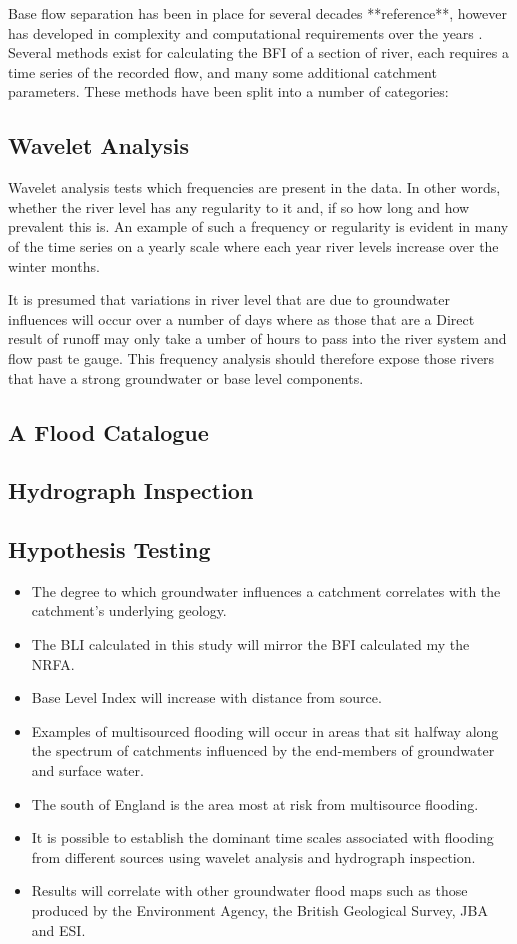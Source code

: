 \documentclass[DIV=calc, paper=a4, fontsize=11pt, twocolumn]{scrartcl}	 %
\begin{document}
Base flow separation has been in place for several decades **reference**, however has developed in complexity and computational requirements over the years \citep{Stadnyk2015}. Several methods exist for calculating the BFI of a section of river, each requires a time series of the recorded flow, and many some additional catchment parameters. These methods have been split into a number of categories: 


	\subsection*{Wavelet Analysis}
Wavelet analysis tests which frequencies are present in the data. In other words, whether the river level has any regularity to it and, if so how long and how prevalent this is. An example of such a frequency or regularity is evident in many of the time series on a yearly scale  where each year river levels increase over the winter months.

It is presumed that variations in river level that are due to groundwater influences will occur over a number of days where as those that are a Direct result of runoff may only take a umber of hours to pass into the river system and flow past te gauge. This frequency analysis should therefore expose those rivers that have a strong groundwater or base level components.

	\subsection*{A Flood Catalogue}
	\subsection*{Hydrograph Inspection}
	\subsection*{Hypothesis Testing}
		\begin{itemize}
			\item The degree to which groundwater influences a catchment correlates with the catchment's underlying geology.
			\item The BLI calculated in this study will mirror the BFI calculated my the NRFA.
			\item Base Level Index will increase with distance from source.
			\item Examples of multisourced flooding will occur in areas that sit halfway along the spectrum of catchments influenced by the end-members of groundwater and surface water.
			\item The south of England is the area most at risk from multisource flooding.
			\item It is possible to establish the dominant time scales associated with flooding from different sources using wavelet analysis and hydrograph inspection.
			\item Results will correlate with other groundwater flood maps such as those produced by the Environment Agency, the British Geological Survey, JBA and ESI.
		\end{itemize}
\end{document}
